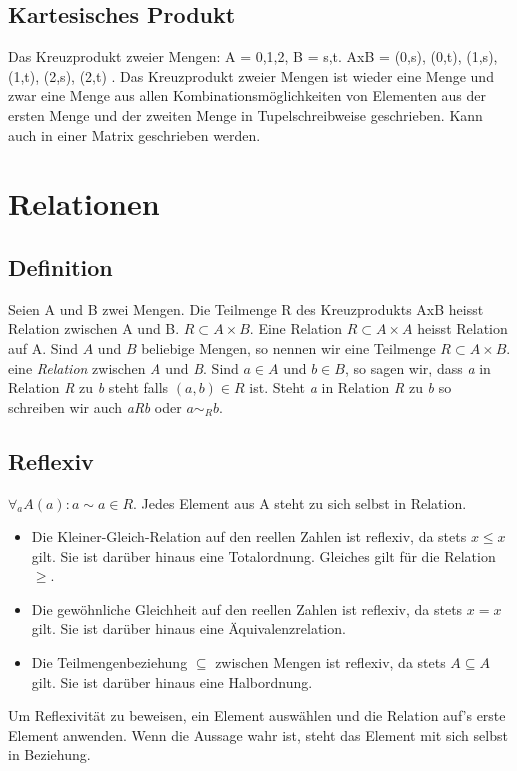 \documentclass[a4paper,DIV10,12pt,headsepline,smallheadings,halfparskip-]{scrreprt}
\begin{document}
	\subsection{Kartesisches Produkt}
	Das Kreuzprodukt zweier Mengen: A = {0,1,2}, B = {s,t}. AxB = { (0,s), (0,t), (1,s), (1,t), (2,s), (2,t) }. Das Kreuzprodukt  zweier Mengen ist wieder eine Menge und zwar eine Menge aus allen Kombinationsmöglichkeiten von Elementen aus der ersten Menge und der zweiten Menge in Tupelschreibweise geschrieben. Kann auch in einer Matrix geschrieben werden.
	\section{Relationen}
	\subsection{Definition}
	Seien A und B zwei Mengen. Die Teilmenge R des Kreuzprodukts AxB heisst Relation zwischen A und B.
	\(R \subset A \times B\).\newline
	Eine Relation \(R \subset A \times A\) heisst Relation auf A. Sind \(A \) und \( B \) beliebige Mengen, so nennen wir eine Teilmenge \(R \subset A \times B. \) eine \emph{Relation} zwischen \emph{A} und \emph{B}. Sind \(a \in A \) und \(b \in B \), so sagen wir, dass \emph{a} in Relation \emph{R} zu \emph{b} steht falls \( (a, b) \in R \) ist. Steht \emph{a} in Relation \emph{R} zu \emph{b} so schreiben wir auch \emph{aRb} oder \(a \sim_R b \).

	\subsection{Reflexiv}
	\( \forall_a A(a): a \sim a \in R \). Jedes Element aus A steht zu sich selbst in Relation.
	\begin{itemize}
		\item Die Kleiner-Gleich-Relation auf den reellen Zahlen ist reflexiv, da stets \(x \leq x \) gilt. Sie ist darüber hinaus eine Totalordnung. Gleiches gilt für die Relation \( \geq \).
		\item Die gewöhnliche Gleichheit auf den reellen Zahlen ist reflexiv, da stets \(x = x\) gilt. Sie ist darüber hinaus eine Äquivalenzrelation.
		\item Die Teilmengenbeziehung \(\subseteq \) zwischen Mengen ist reflexiv, da stets \(A \subseteq A\) gilt. Sie ist darüber hinaus eine Halbordnung.
	\end{itemize}
        Um Reflexivität zu beweisen, ein Element auswählen und die Relation
        auf's erste Element anwenden. Wenn die Aussage wahr ist, steht das
        Element mit sich selbst in Beziehung.
\end{document}
